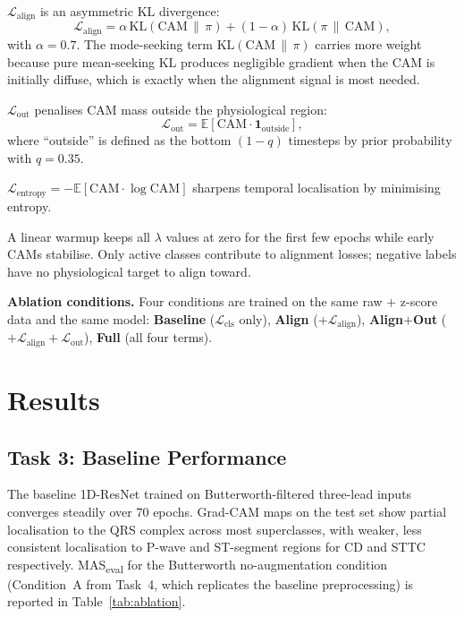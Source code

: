 \documentclass{article}
\begin{document}
$\mathcal{L}_{\mathrm{align}}$ is an asymmetric KL divergence:
\begin{equation}
\mathcal{L}_{\mathrm{align}} = \alpha\,\mathrm{KL}(\mathrm{CAM}\,\|\,\pi)
+ (1-\alpha)\,\mathrm{KL}(\pi\,\|\,\mathrm{CAM}),
\label{eq:align}
\end{equation}
with $\alpha{=}0.7$. The mode-seeking term $\mathrm{KL}(\mathrm{CAM}\,\|\,\pi)$
carries more weight because pure mean-seeking KL produces negligible
gradient when the CAM is initially diffuse, which is exactly when the
alignment signal is most needed.

$\mathcal{L}_{\mathrm{out}}$ penalises CAM mass outside the
physiological region:
\begin{equation}
\mathcal{L}_{\mathrm{out}} = \mathbb{E}[\mathrm{CAM} \cdot \mathbf{1}_{\mathrm{outside}}],
\label{eq:out}
\end{equation}
where ``outside'' is defined as the bottom $(1-q)$ timesteps by
prior probability with $q{=}0.35$.

$\mathcal{L}_{\mathrm{entropy}} = -\mathbb{E}[\mathrm{CAM} \cdot \log\mathrm{CAM}]$
sharpens temporal localisation by minimising entropy.

A linear warmup keeps all $\lambda$ values at zero for the first
few epochs while early CAMs stabilise. Only active classes
contribute to alignment losses; negative labels have no physiological
target to align toward.

\textbf{Ablation conditions.} Four conditions are trained on the same
raw $+$ z-score data and the same model:
\textbf{Baseline} ($\mathcal{L}_{\mathrm{cls}}$ only),
\textbf{Align} ($+\mathcal{L}_{\mathrm{align}}$),
\textbf{Align$+$Out} ($+\mathcal{L}_{\mathrm{align}}+\mathcal{L}_{\mathrm{out}}$),
\textbf{Full} (all four terms).

\section{Results}

\subsection{Task 3: Baseline Performance}

The baseline 1D-ResNet trained on Butterworth-filtered three-lead
inputs converges steadily over 70 epochs. Grad-CAM maps on the test
set show partial localisation to the QRS complex across most
superclasses, with weaker, less consistent localisation to P-wave
and ST-segment regions for CD and STTC respectively.
MAS\textsubscript{eval} for the Butterworth no-augmentation
condition (Condition~A from Task~4, which replicates the baseline
preprocessing) is reported in Table~\ref{tab:ablation}.
\end{document}
